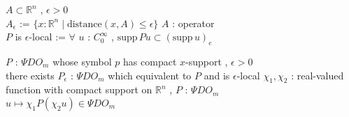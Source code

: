 

\begin{Definition}
\itemdefi
  \For \(A \subset \mathbb{R}^n\) , \(\epsilon > 0\) \\
  \Define \(A_{\epsilon}\) := \(\{x : \mathbb{R}^n \mid \text{distance}(x,A) \leq \epsilon\}\)
\itemdefi
  \For \(A\) : operator \\
  \Define \(P\) is \(\epsilon\)-local := \(\forall\) \(u\) : \(C^\infty_0\) , \(\text{supp} \, Pu \subset (\text{supp} \, u)_e\)
\end{Definition}

\begin{Theorem}
\itemprop
  \For \(P\) : \(\Psi DO_m\) whose symbol \(p\) has compact \(x\)-support , \(\epsilon > 0\) \\
  \Then there exists \(P_{\epsilon}\) : \(\Psi DO_m\) which equivalent to \(P\) and is \(\epsilon\)-local
\itemprop
  \For \(\chi_1 , \chi_2\) : real-valued function with compact support on \(\mathbb{R}^n\) , \(P\) : \(\Psi DO_m\) \\
  \Then \(u \mapsto \chi_1 P(\chi_2 u) \in \Psi DO_m\)
\end{Theorem}

